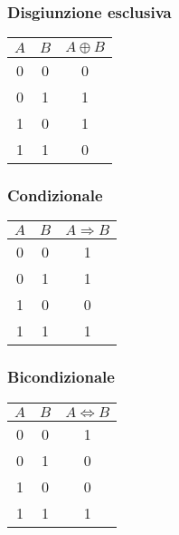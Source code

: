 \documentclass[a4paper,12pt]{article}
\theoremstyle{mystyle}
\begin{document}
\newpage

\subsubsection{Disgiunzione esclusiva}
\begin{table}[h]
    \centering
    \begin{tabular}{|c|c|c|}
        \hline
        \textbf{\(A\)} & \textbf{\(B\)} & \textbf{\(A \oplus B\)} \\
        \hline
        0 & 0 & 0 \\
        \hline
        0 & 1 & 1 \\
        \hline
        1 & 0 & 1 \\
        \hline
        1 & 1 & 0 \\
        \hline
    \end{tabular}
\end{table}

\subsubsection{Condizionale}
\begin{table}[h]
    \centering
    \begin{tabular}{|c|c|c|}
        \hline
        \textbf{\(A\)} & \textbf{\(B\)} & \textbf{\(A \Rightarrow B\)} \\
        \hline
        0 & 0 & 1 \\
        \hline
        0 & 1 & 1 \\
        \hline
        1 & 0 & 0 \\
        \hline
        1 & 1 & 1 \\
        \hline
    \end{tabular}
\end{table}

\subsubsection{Bicondizionale}
\begin{table}[h]
    \centering
    \begin{tabular}{|c|c|c|}
        \hline
        \textbf{\(A\)} & \textbf{\(B\)} & \textbf{\(A \Leftrightarrow B\)} \\
        \hline
        0 & 0 & 1 \\
        \hline
        0 & 1 & 0 \\
        \hline
        1 & 0 & 0 \\
        \hline
        1 & 1 & 1 \\
        \hline
    \end{tabular}
\end{table}
\end{document}

